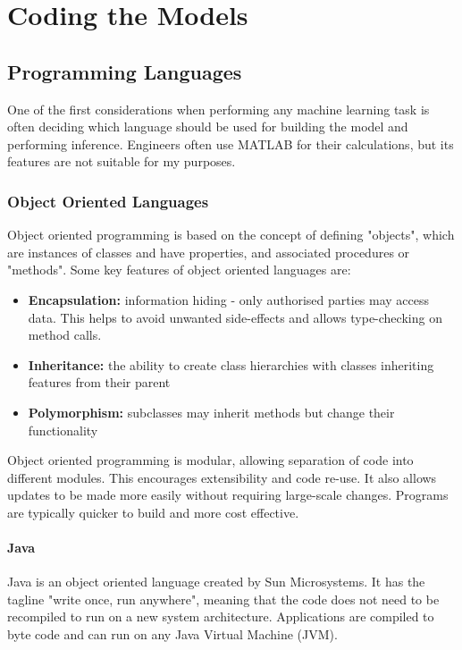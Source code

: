 \chapter{Coding the Models}\label{chap:codingTheModels}

\section{Programming Languages}

One of the first considerations when performing any machine learning task is often deciding which language should be used for building the model and performing inference. Engineers often use MATLAB for their calculations, but its features are not suitable for my purposes.

\subsection{Object Oriented Languages}

Object oriented programming is based on the concept of defining "objects", which are instances of classes and have properties, and associated procedures or "methods". Some key features of object oriented languages are:

\begin{itemize}

\item \textbf{Encapsulation:} information hiding - only authorised parties may access data. This helps to avoid unwanted side-effects and allows type-checking on method calls.
\item \textbf{Inheritance:} the ability to create class hierarchies with classes inheriting features from their parent
\item \textbf{Polymorphism:} subclasses may inherit methods but change their functionality

\end{itemize}

Object oriented programming is modular, allowing separation of code into different modules. This encourages extensibility and code re-use. It also allows updates to be made more easily without requiring large-scale changes. Programs are typically quicker to build and more cost effective.

\subsubsection{Java}

Java is an object oriented language created by Sun Microsystems. It has the tagline "write once, run anywhere", meaning that the code does not need to be recompiled to run on a new system architecture. Applications are compiled to byte code and can run on any Java Virtual Machine (JVM).

